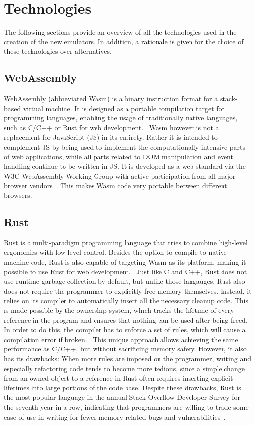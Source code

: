 \section {Technologies}
The following sections provide an overview of all the technologies used in the creation of the new emulators.
In addition, a rationale is given for the choice of these technologies over alternatives.

\subsection{WebAssembly}
WebAssembly (abbreviated Wasm) is a binary instruction format for a stack-based virtual machine. It is designed as a portable compilation target for programming languages, enabling the usage of traditionally native languages, such as C/C++ or Rust for web development.~\cite{wasmweb}
Wasm however is not a replacement for JavaScript (JS) in its entirety. Rather it is intended to complement JS by being used to implement the computationally intensive parts of web applications, while all parts related to DOM manipulation and event handling continue to be written in JS. It is developed as a web standard via the W3C WebAssembly Working Group with active participation from all major browser vendors~\cite{wasmmdn}.
This makes Wasm code very portable between different browsers.

\subsection{Rust}
Rust is a multi-paradigm programming language that tries to combine high-level ergonomics with low-level control. \cite[Introduction]{klabnik2019rust}
Besides the option to compile to native machine code, Rust is also capable of targeting Wasm as its platform, making it possible to use Rust for web development.~\cite{rustwasm}
Just like C and C++, Rust does not use runtime garbage collection by default, but unlike those langauges, Rust also does not require the programmer to explicitly free memory themselves.
Instead, it relies on its compiler to automatically insert all the necessary cleanup code. This is made possible by the ownership system, which tracks the lifetime of every reference in the program and ensures that nothing can be used after being freed.
In order to do this, the compiler has to enforce a set of rules, which will cause a compilation error if broken.~\cite[Chapter~4]{klabnik2019rust}
This unique approach allows achieving the same performance as C/C++, but without sacrificing memory safety.
However, it also has its drawbacks: When more rules are imposed on the programmer, writing and especially refactoring code tends to become more tedious, since a simple change from an owned object to a reference in Rust often requires inserting explicit lifetimes into large portions of the code base.
Despite these drawbacks, Rust is the most popular language in the annual Stack Overflow Developer Survey for the seventh year in a row, indicating that programmers are willing to trade some ease of use in writing for fewer memory-related bugs and vulnerabilities~\cite{sosurvey}.

